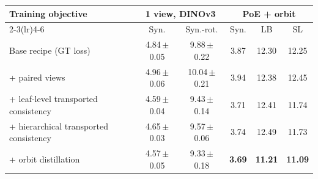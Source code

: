 \begin{tabular}{@{}l cc ccc@{}}
\toprule
Training objective & \multicolumn{2}{c}{1 view, DINOv3} & \multicolumn{3}{c}{PoE + orbit} \\
\cmidrule(lr){2-3}\cmidrule(lr){4-6} & Syn. & Syn.-rot. & Syn. & LB & SL \\
\midrule
Base recipe (GT loss) & 4.84\,{\scriptsize$\pm$0.05} & 9.88\,{\scriptsize$\pm$0.22} & 3.87 & 12.30 & 12.25 \\
+ paired views & 4.96\,{\scriptsize$\pm$0.06} & 10.04\,{\scriptsize$\pm$0.21} & 3.94 & 12.38 & 12.45 \\
+ leaf-level transported consistency & 4.59\,{\scriptsize$\pm$0.04} & 9.43\,{\scriptsize$\pm$0.14} & 3.71 & 12.41 & 11.74 \\
+ hierarchical transported consistency & 4.65\,{\scriptsize$\pm$0.03} & 9.57\,{\scriptsize$\pm$0.06} & 3.74 & 12.49 & 11.73 \\
\midrule
+ orbit distillation & 4.57\,{\scriptsize$\pm$0.05} & 9.33\,{\scriptsize$\pm$0.18} & \textbf{3.69} & \textbf{11.21} & \textbf{11.09} \\
\bottomrule
\end{tabular}